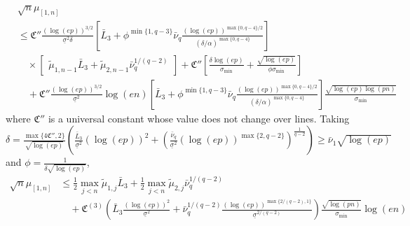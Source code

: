 \documentclass[aos]{imsart}
\begin{document}
\begin{appendix}
\begin{equation*}
\begin{aligned}
    & \sqrt{n} \mu_{[1,n]} \\
    & \leq \mathfrak{C}'' \frac{(\log(ep))^{3/2}}{\underline\sigma^2 \delta} \left[ 
        \bar{L}_{3} + \phi^{\min\{1, q-3\}} \bar\nu_{q} \frac{ {(\log(ep))}^{\max\{0, q-4\}/2}}{(\delta/\alpha)^{\max\{0, q-4\}}}
    \right] \\
    & \quad \times \left[ \begin{aligned}
        \tilde\mu_{1,n-1} \bar{L}_{3}
        + \tilde\mu_{2,n-1} \bar\nu_{q}^{1/(q-2)}
    \end{aligned} \right] 
    + \mathfrak{C}'' \left[ 
        \frac{\delta \log(ep)}{\sigma_{\min}}  
        + \frac{\sqrt{\log(ep)}}{\phi \sigma_{\min}}
    \right] \\
    & \quad + \mathfrak{C}'' \frac{(\log(ep))^{3/2}}{\underline{\sigma}^2} \log\left(en\right)
    \left[ 
        \bar{L}_{3} + \phi^{\min\{1, q-3\}} \bar\nu_{q} \frac{ {(\log(ep))}^{\max\{0, q-4\}/2}}{(\delta/\alpha)^{\max\{0, q-4\}}}
    \right] 
    \frac{\sqrt{\log(ep)\log(pn)}}{\sigma_{\min}}
\end{aligned}
\end{equation*}
where $\mathfrak{C}''$ is a universal constant whose value does not change over lines.
Taking $\delta = \frac{\max\{4 \mathfrak{C}'', 2\}}{\sqrt{\log(ep)}} \left( 
    \frac{\bar{L}_{3}}{\underline{\sigma}^2} (\log(ep))^2
    + \left(\frac{\bar\nu_{q}}{\underline{\sigma}^2} (\log(ep))^{\max\{2, q-2\}} \right)^{\frac{1}{q-2}} 
\right) \geq \bar\nu_{1} \sqrt{\log(ep)}$
and $\phi = \frac{1}{\delta \sqrt{\log(ep)}}$, 
\begin{equation*}
\begin{aligned}
    \sqrt{n} \mu_{[1,n]}
    & \leq \frac{1}{2} \max_{j<n}\tilde\mu_{1,j} \bar{L}_{3}
    + \frac{1}{2} \max_{j<n}\tilde\mu_{2,j} \bar\nu_{q}^{1/(q-2)} \\
    & \quad + \mathfrak{C}^{(3)} \left(
        \bar{L}_{3} \frac{(\log(ep))^2}{\underline{\sigma}^2}
        + \bar\nu_{q}^{1/(q-2)} \frac{(\log(ep))^{\max\{2/(q-2),1\}}}{\underline{\sigma}^{2/(q-2)}}
    \right)
    \frac{\sqrt{\log(p n)}}{\sigma_{\min}} \log\left(e n\right) \\

\end{aligned}
\end{equation*}
\end{appendix}
\end{document}
